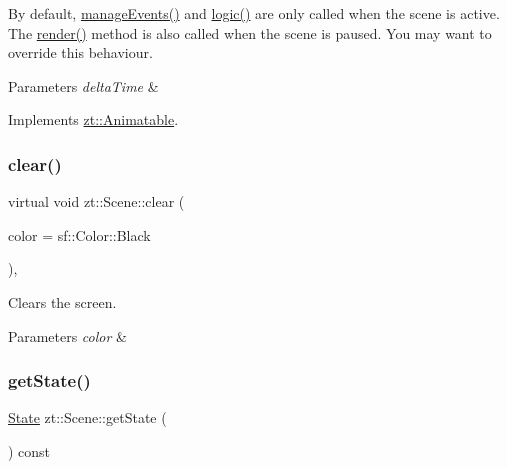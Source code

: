 By default, \hyperlink{classzt_1_1_scene_ac450fd3460c158c0a3f2661df0410477}{manage\+Events()} and \hyperlink{classzt_1_1_scene_a1150eb60893f3077ecacf94b309414bf}{logic()} are only called when the scene is active. The \hyperlink{classzt_1_1_scene_aa554c0468228aa1aab7e553c52c7b0d4}{render()} method is also called when the scene is paused. You may want to override this behaviour. 
\begin{DoxyParams}{Parameters}
{\em delta\+Time} & \\
\hline
\end{DoxyParams}


Implements \hyperlink{classzt_1_1_animatable}{zt\+::\+Animatable}.

\mbox{\label{classzt_1_1_scene_ae8a778b82813dca9d6153fdcb38896a1}} 
\subsubsection{\texorpdfstring{clear()}{clear()}}
{\footnotesize\ttfamily virtual void zt\+::\+Scene\+::clear (\begin{DoxyParamCaption}\item[{const sf\+::\+Color \&}]{color = {\ttfamily sf\+:\+:Color\+:\+:Black} }\end{DoxyParamCaption})\hspace{0.3cm}{\ttfamily [protected]}, {\ttfamily [virtual]}}



Clears the screen. 


\begin{DoxyParams}{Parameters}
{\em color} & \\
\hline
\end{DoxyParams}
\mbox{\label{classzt_1_1_scene_a8ee519dcf39f795ebcaf6b3cb2dbb930}} 
\subsubsection{\texorpdfstring{get\+State()}{getState()}}
{\footnotesize\ttfamily \hyperlink{classzt_1_1_scene_a5618d9448cd874af20a6be8ed60c87a5}{State} zt\+::\+Scene\+::get\+State (\begin{DoxyParamCaption}{ }\end{DoxyParamCaption}) const}

